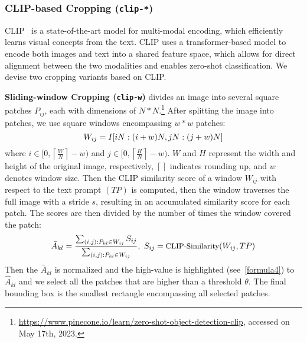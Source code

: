 \subsubsection{CLIP-based Cropping (\texttt{clip-*})}

CLIP~\citep{clip} is a state-of-the-art model for multi-modal encoding, which efficiently learns visual concepts from the text. CLIP uses a transformer-based model to encode both images and text into a shared feature space, which allows for direct alignment between the two modalities and enables zero-shot classification. We devise two cropping variants based on CLIP.

\textbf{Sliding-window Cropping (\texttt{clip-w})} 
divides an image into several square patches $P_{ij}$, each with dimensions of $N*N$.\footnote{\scriptsize \url{https://www.pinecone.io/learn/zero-shot-object-detection-clip}, accessed on May 17th, 2023.} After splitting the image into patches, we use square windows encompassing $w*w$ patches:
\begin{equation}
\small
W_{ij} = I[iN:(i+w)N, jN:(j+w)N]
\end{equation}
where $i \in [0, \left\lceil\frac{W}{N}\right\rceil-w)$ and $j \in [0, \left\lceil\frac{H}{N}\right\rceil-w)$. $W$ and $H$ represent the width and height of the original image, respectively, $\left\lceil\right\rceil$ indicates rounding up, and $w$ denotes window size. Then the CLIP similarity score of a window $W_{ij}$ with respect to the text prompt $(TP)$ is computed, then the window traverses the full image with a stride $s$, resulting in an accumulated similarity score for each patch. The scores are then divided by the number of times the window covered the patch:
\begin{equation}
\small
\bar{A}_{kl} = \frac{\sum_{(i,j): P_{kl} \in W_{ij}} S_{ij}}{\sum_{(i,j): P_{kl} \in W_{ij}}},~
S_{ij} = \text{CLIP-Similarity}(W_{ij}, TP)
\end{equation}
Then the $\bar{A}_{kl}$ is normalized and the high-value is highlighted (see~\autoref{formula4}) to $\hat{A}_{kl}$  and we select all the patches that are higher than a threshold $\theta$. The final bounding box is the smallest rectangle encompassing all selected patches.


